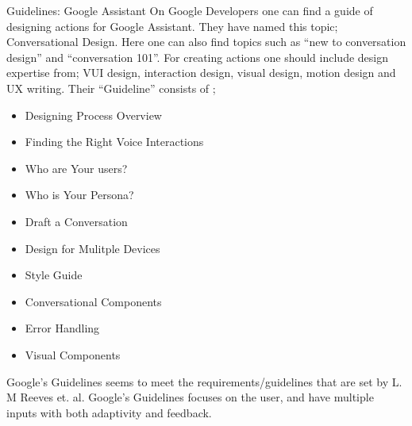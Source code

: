 \documentclass[fleqn,10pt]{wlscirep}
\begin{document}
Guidelines: Google Assistant
On Google Developers \cite{GoogleDevelopers} one can find a guide of  designing actions for Google Assistant. They have named this topic; Conversational Design. Here one can also find topics such as “new to conversation design” and “conversation 101”. 
For creating actions one should include design expertise from; VUI design, interaction design, visual design, motion design and UX writing. 
Their “Guideline” consists of \cite{GoogleDevelopers}; 
\begin{itemize}
    \item Designing Process Overview
    \item Finding the Right Voice Interactions
    \item Who are Your users? 
    \item Who is Your Persona?
    \item Draft a Conversation 
    \item Design for Mulitple Devices
    \item Style Guide
    \item Conversational Components 
    \item Error Handling
    \item Visual Components
\end{itemize}
Google’s Guidelines seems to meet the requirements/guidelines that are set by L. M Reeves et. al. \cite{reeves.lm} Google's Guidelines focuses on the user, and have multiple inputs with both adaptivity and feedback. 
\end{document}
